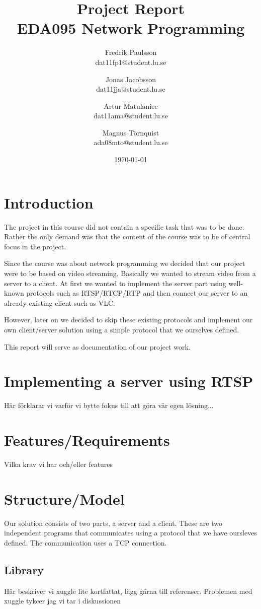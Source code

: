 \documentclass[a4paper]{article}
\title{Project Report \\ EDA095 Network Programming}
\date{\today}
\author{Fredrik Paulsson \\ dat11fp1@student.lu.se \and Jonas Jacobsson \\ dat11jja@student.lu.se \and Artur Matulaniec \\ dat11ama@student.lu.se \and Magnus Törnquist \\ ada08mto@student.lu.se}
\begin{document}
\maketitle

\section{Introduction}
The project in this course did not contain a specific task that was to be done. Rather the only demand was that the content of the course was to be of central focus in the project.

Since the course was about network programming we decided that our project were to be based on video streaming. Basically we wanted to stream video from a server to a client. At first we wanted to implement the server part using well-known protocols such as RTSP/RTCP/RTP and then connect our server to an already existing client such as VLC.

However, later on we decided to skip these existing protocols and implement our own client/server solution using a simple protocol that we ourselves defined.

This report will serve as documentation of our project work.

\section{Implementing a server using RTSP}
Här förklarar vi varför vi bytte fokus till att göra vår egen lösning...

\section{Features/Requirements}
Vilka krav vi har och/eller features

\section{Structure/Model}
Our solution consists of two parts, a server and a client. These are two independent programs that communicates using a protocol that we have oursleves defined. The communication uses a TCP connection.

\subsection{Library}
Här beskriver vi xuggle lite kortfattat, lägg gärna till referenser. Problemen med xuggle tykcer jag vi tar i diskussionen
\end{document}
